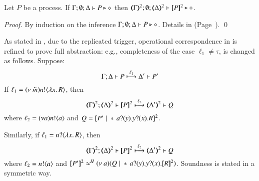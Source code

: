 

\begin{proposition}\myrm
	\label{prop:typepres_HOp_to_p}
	Let $P$ be a \HOp process. 
	If $\Gamma; \emptyset; \Delta \vdash P \triangleright \diamond$ then 
	$\mapt{\Gamma}^{2}; \emptyset; \mapt{\Delta}^{2} \proves \map{P}^{2} \hastype \Proc$.
\end{proposition}

\begin{proof}
	By induction on the inference $\Gamma; \emptyset; \Delta \vdash P \triangleright \diamond$. 
	Details in 
	(Page~\pageref{app:prop:typepres_HOp_to_p}).
	\qed
\end{proof}

\begin{remark}
	As stated in  \cite[Lem.\,5.2.2]{SangiorgiD:expmpa}, 
	due to the replicated trigger,  
	operational correspondence in  is refined to prove  
	full abstraction: 
	e.g., completeness of the case $\ell_1 \neq \tau$, is changed as follows.
	Suppose:
%
	\[
		\Gamma; \Delta \vdash P \stackrel{\ell_1}{\longmapsto} \Delta' \vdash P'{}
	\]
%
	If $\ell_1 = (\nu\ \tilde{m}) n ! \langle \lambda  x.\,R \rangle$, 
	then %
%
	\[
		\horel{\tmap{\Gamma}{2}}{\tmap{\Delta}{2}}{\pmap{P}{2}}{\hby{\ell_2}}{\tmap{\Delta'}{2}}{Q}{}
	\]
%
	where  $\ell_2 = (\nu a)n ! \langle a \rangle$ and
	$Q = [\!\![P' \;|\;  \ast\,{} a ? (y) . y ? (x) . R]\!\!]^{2}$.

	\noi Similarly, if  
	$\ell_1 = n ? \langle \lambda  x.\,R \rangle$, 
	then %
	\[
		\horel{\tmap{\Gamma}{2}}{\tmap{\Delta}{2}}{\pmap{P}{2}}{\hby{\ell_2}}{\tmap{\Delta'}{2}}{Q}{}
	\]
	where $\ell_2 = n ! \langle a \rangle$ and
	$\pmap{P'}{2} \wb \newsp{a}{Q \Par  \repl{} \binp{a}{y} \binp{y}{x} \pmap{R}{2}}$.
	Soundness is stated in a symmetric way.
\end{remark}

